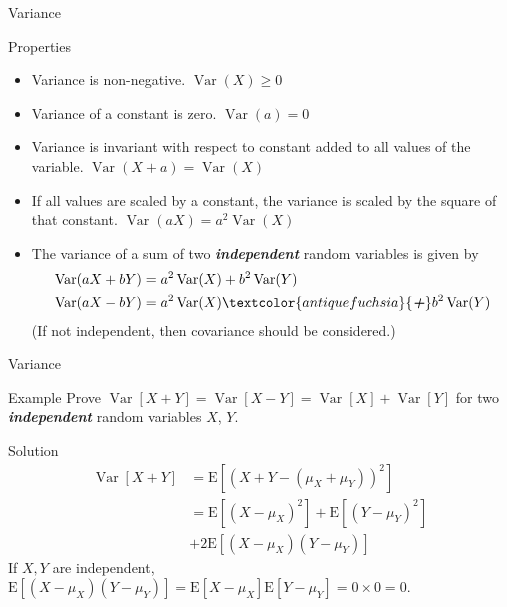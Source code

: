 \documentclass{beamer}
\newcommand{\bb}[1]{\textcolor{antiquefuchsia}{\textbf{\textit{#1}}}}
\begin{document}
\begin{frame}{Variance}
\begin{block}{Properties}
\begin{itemize}
\item
Variance is non-negative. 
$
\operatorname{Var}(X) \geq 0
$
\item
Variance of a constant is zero. 
$
\operatorname{Var}(a)=0
$
\item
Variance is invariant with respect to constant added to all values of the variable. 
$
\operatorname{Var}(X+a)=\operatorname{Var}(X)
$
\item
If all values are scaled by a constant, the variance is scaled by the square of that constant. 
$
\operatorname{Var}(a X)=a^{2} \operatorname{Var}(X)
$
\item
The variance of a sum of two \bb{independent} random variables is given by
$$
\begin{aligned}
&\operatorname{Var}(a X+b Y)=a^{2} \operatorname{Var}(X)+b^{2} \operatorname{Var}(Y)\\
&\operatorname{Var}(a X-b Y)=a^{2} \operatorname{Var}(X)\bb{+}b^{2} \operatorname{Var}(Y)
\end{aligned}
$$
(If not independent, then covariance should be considered.)
\end{itemize}
\end{block}
\end{frame}

\begin{frame}{Variance}
\begin{block}{Example}
Prove $\operatorname{Var}[X+Y]=\operatorname{Var}[X-Y]=\operatorname{Var}[X]+\operatorname{Var}[Y]$ for two \bb{independent} random variables $X$, $Y$.
\end{block}
\pause
\begin{block}{Solution}
$$
\begin{aligned}
\operatorname{Var}[X+Y] &=\mathrm{E}\left[\left(X+Y-\left(\mu_{X}+\mu_{Y}\right)\right)^{2}\right] \\
&=\mathrm{E}\left[\left(X-\mu_{X}\right)^{2}\right]+\mathrm{E}\left[\left(Y-\mu_{Y}\right)^{2}\right]\\
&+2 \mathrm{E}\left[\left(X-\mu_{X}\right)\left(Y-\mu_{Y}\right)\right]
\end{aligned}
$$
If $X,Y$ are independent, $\mathrm{E}\left[\left(X-\mu_{X}\right)\left(Y-\mu_{Y}\right)\right]=\mathrm{E}[X-\mu_{X}]\mathrm{E}[Y-\mu_{Y}]=0\times 0=0$.
\end{block}
\end{frame}
\end{document}
